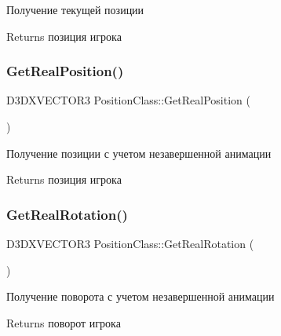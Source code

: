 Получение текущей позиции 

\begin{DoxyReturn}{Returns}
позиция игрока 
\end{DoxyReturn}
\mbox{\label{class_position_class_acbd3167d621af1d35496b7be3347165a}} 
\subsubsection{\texorpdfstring{Get\+Real\+Position()}{GetRealPosition()}}
{\footnotesize\ttfamily D3\+D\+X\+V\+E\+C\+T\+O\+R3 Position\+Class\+::\+Get\+Real\+Position (\begin{DoxyParamCaption}{ }\end{DoxyParamCaption})}



Получение позиции с учетом незавершенной анимации 

\begin{DoxyReturn}{Returns}
позиция игрока 
\end{DoxyReturn}
\mbox{\label{class_position_class_ad57c43e85e9b23ce99ce651bba05a609}} 
\subsubsection{\texorpdfstring{Get\+Real\+Rotation()}{GetRealRotation()}}
{\footnotesize\ttfamily D3\+D\+X\+V\+E\+C\+T\+O\+R3 Position\+Class\+::\+Get\+Real\+Rotation (\begin{DoxyParamCaption}{ }\end{DoxyParamCaption})}



Получение поворота с учетом незавершенной анимации 

\begin{DoxyReturn}{Returns}
поворот игрока 
\end{DoxyReturn}
\mbox{\label{class_position_class_a69c69980d0ca1dbfab93ea46f6019e99}} 
